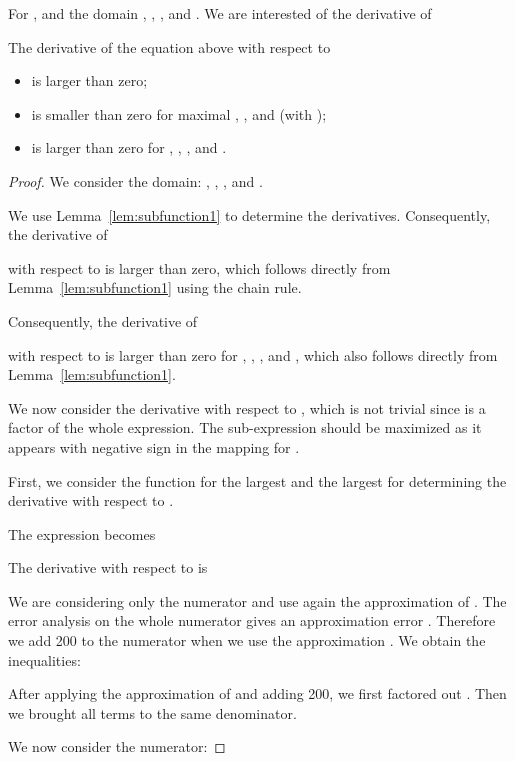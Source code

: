 \documentclass{article}
\begin{document}
\begin{lemma}
\label{proof:monotonederivative}
For , 
and the domain 
, 
,
, and 
.
We are interested of the derivative of


The derivative of the equation above with
respect to
\begin{itemize}
\item  is larger than zero;
\item  is smaller than zero for maximal
, , and  (with
);
\item  is larger than zero for , , , and .
\end{itemize}

\end{lemma}




\begin{proof}
We consider the domain:
, 
,
, and 
.



We use Lemma~\ref{lem:subfunction1} to determine the derivatives.
Consequently, the derivative of 

with respect to   is larger than zero, which follows
directly from  Lemma~\ref{lem:subfunction1} using the chain rule.

{Consequently,} the derivative of 

with respect to   is larger than zero for , , , and ,
which also follows
directly from  Lemma~\ref{lem:subfunction1}.

We now consider the derivative with respect to ,
which is not trivial since  is a factor of the whole expression.
The sub-expression should be maximized as it appears with
negative sign in the mapping for .


First,
we consider the function for  
the largest  and the largest  
for determining the derivative with respect to . 


The expression becomes


The derivative with respect to  is 


We are considering only the numerator and use again the approximation
of \citet{Ren:07}.
The error analysis on the whole numerator gives an approximation error . Therefore
we add 200 to the numerator when we use the approximation \citet{Ren:07}.
We obtain the inequalities:

After applying the approximation
of \citet{Ren:07} and adding 200,
we first factored out .
Then we brought all terms to the same denominator.

We now consider the numerator:



\end{proof}
\end{document}
